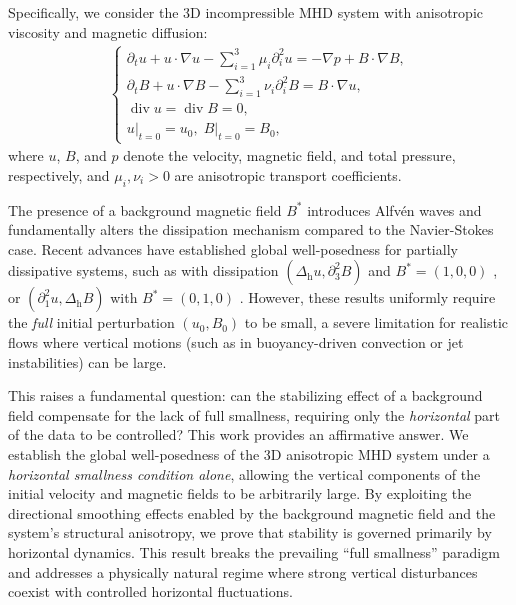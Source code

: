 \documentclass[11pt]{amsart}
\theoremstyle{definition}
\numberwithin{equation}{section}
\begin{document}
Specifically, we consider the 3D incompressible MHD system with anisotropic viscosity and magnetic diffusion:
\begin{align} \label{MHD}
	\left\{\begin{array}{l}
		\displaystyle {\partial_t}u+u\cdot\nabla{u}-\sum_{i=1}^3\mu_i\partial_i^2u =-\nabla {p}+B\cdot\nabla{B},\\
		\displaystyle {\partial_t}B+u\cdot\nabla{B}-\sum_{i=1}^3\nu_i\partial_i^2B =B\cdot\nabla{u},\\
		\displaystyle \operatorname{div}u=\operatorname{div}B=0,\\
		u{|_{t = 0}} =  {u_0},\; B{|_{t = 0}} =  {B_0},
	\end{array}
	\right.
\end{align}
where $u$, $B$, and $p$ denote the velocity, magnetic field, and total pressure, respectively, and $\mu_i, \nu_i > 0$ are anisotropic transport coefficients.

The presence of a background magnetic field $B^*$ introduces Alfv\'{e}n waves and fundamentally alters the dissipation mechanism compared to the Navier-Stokes case. Recent advances have established global well-posedness for partially dissipative systems, such as with dissipation $(\Delta_\mathrm{h}u,\partial_3^2B)$ and $B^*=(1,0,0)$ \cite{24han}, or $(\partial_1^2u,\Delta_\mathrm{h}B)$ with $B^*=(0,1,0)$ \cite{26wu}. However, these results uniformly require the \emph{full} initial perturbation $(u_0, B_0)$ to be small, a severe limitation for realistic flows where vertical motions (such as in buoyancy-driven convection or jet instabilities) can be large.

This raises a fundamental question: can the stabilizing effect of a background field compensate for the lack of full smallness, requiring only the \emph{horizontal} part of the data to be controlled?
{This work provides an affirmative answer.} We establish the global well-posedness of the 3D anisotropic MHD system under a \emph{horizontal smallness condition alone}, allowing the vertical components of the initial velocity and magnetic fields to be arbitrarily large. By exploiting the directional smoothing effects enabled by the background magnetic field and the system's structural anisotropy, we prove that stability is governed primarily by horizontal dynamics. This result breaks the prevailing ``full smallness'' paradigm and addresses a physically natural regime where strong vertical disturbances coexist with controlled horizontal fluctuations.
\end{document}
